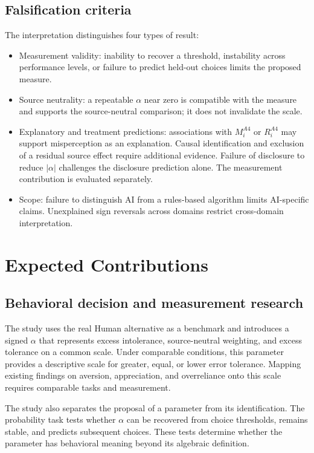 \documentclass[11pt,a4paper]{article}
\begin{document}
\subsection{Falsification criteria}

The interpretation distinguishes four types of result:

\begin{itemize}
\item Measurement validity: inability to recover a threshold, instability across performance levels, or failure to predict held-out choices limits the proposed measure.
\item Source neutrality: a repeatable $\alpha$ near zero is compatible with the measure and supports the source-neutral comparison; it does not invalidate the scale.
\item Explanatory and treatment predictions: associations with $M_i^{A4}$ or $R_i^{A4}$ may support misperception as an explanation. Causal identification and exclusion of a residual source effect require additional evidence. Failure of disclosure to reduce $|\alpha|$ challenges the disclosure prediction alone. The measurement contribution is evaluated separately.
\item Scope: failure to distinguish AI from a rules-based algorithm limits AI-specific claims. Unexplained sign reversals across domains restrict cross-domain interpretation.
\end{itemize}

\section{Expected Contributions}

\subsection{Behavioral decision and measurement research}

The study uses the real Human alternative as a benchmark and introduces a signed $\alpha$ that represents excess intolerance, source-neutral weighting, and excess tolerance on a common scale. Under comparable conditions, this parameter provides a descriptive scale for greater, equal, or lower error tolerance. Mapping existing findings on aversion, appreciation, and overreliance onto this scale requires comparable tasks and measurement.

The study also separates the proposal of a parameter from its identification. The probability task tests whether $\alpha$ can be recovered from choice thresholds, remains stable, and predicts subsequent choices. These tests determine whether the parameter has behavioral meaning beyond its algebraic definition.
\end{document}
